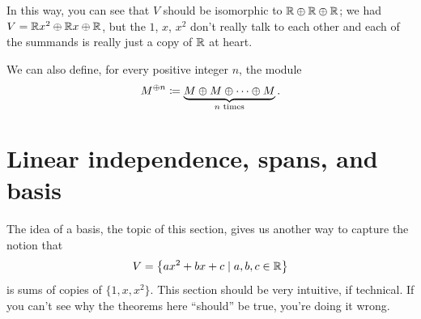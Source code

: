 In this way, you can see that $V$ should be isomorphic
to $\mathbb R \oplus \mathbb R \oplus \mathbb R$;
we had $V = \mathbb R x^2 \oplus \mathbb R x \oplus \mathbb R$,
but the $1$, $x$, $x^2$ don't really talk to each other
and each of the summands is really just a copy of $\mathbb R$ at heart.

\begin{definition}
	We can also define, for every positive integer $n$, the module
	\[ M^{\oplus n}
		\coloneqq \underbrace{M \oplus M \oplus \dots \oplus M}_{\text{$n$ times}}. \]
\end{definition}

\section{Linear independence, spans, and basis}

The idea of a basis, the topic of this section,
gives us another way to capture the notion that
\[ V = \left\{ ax^2+bx+c \mid a,b,c \in \mathbb R \right\} \]
is sums of copies of $\{1,x,x^2\}$.
This section should be very intuitive, if technical.
If you can't see why the theorems here ``should'' be true,
you're doing it wrong.

